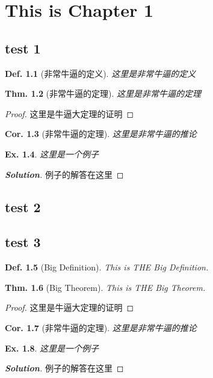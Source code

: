 \documentclass[10pt]{ctexrep}
\newtheorem{theorem}{Thm.}[chapter]
\newtheorem{corollary}[theorem]{Cor.}
\newtheorem{definition}[theorem]{Def.}
\newtheorem{example}[theorem]{Ex.}
\newenvironment{solution}{\begin{proof}[\bf Solution]}{\end{proof}}
\begin{document}
\chapter{This is Chapter 1}
\section{test 1}

\begin{definition}[非常牛逼的定义]
    这里是非常牛逼的定义
\end{definition}


\begin{theorem}[非常牛逼的定理]
    这里是非常牛逼的定理
\end{theorem}

\begin{proof}
    这里是牛逼大定理的证明
\end{proof}

\begin{corollary}[非常牛逼的定理]
    这里是非常牛逼的推论
\end{corollary}

\begin{example}
    这里是一个例子
\end{example}

\begin{solution}
    例子的解答在这里
\end{solution}

\section{test 2}





\section{test 3}
\begin{definition}[Big Definition]
    This is THE Big Definition.
\end{definition}


\begin{theorem}[Big Theorem]
    This is THE Big Theorem.
\end{theorem}

\begin{proof}
    这里是牛逼大定理的证明
\end{proof}

\begin{corollary}[非常牛逼的定理]
    这里是非常牛逼的推论
\end{corollary}

\begin{example}
    这里是一个例子
\end{example}

\begin{solution}
    例子的解答在这里
\end{solution}
\end{document}
